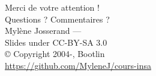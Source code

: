 \documentclass[aspectratio=169,obeyspaces,spaces,hyphens,dvipsnames]{beamer}
\begin{document}
\begin{frame}
  \begin{center}
    \Huge
    Merci de votre attention ! \\
    Questions ? Commentaires ?\\
    \vspace{1cm}
    \large
    Mylène Josserand — \\
    \vspace{1cm}
    Slides under CC-BY-SA 3.0\\
    \scriptsize{© Copyright 2004-\the\year, Bootlin\\
    \url{https://github.com/MyleneJ/cours-insa}}
  \end{center}
\end{frame}
\end{document}

